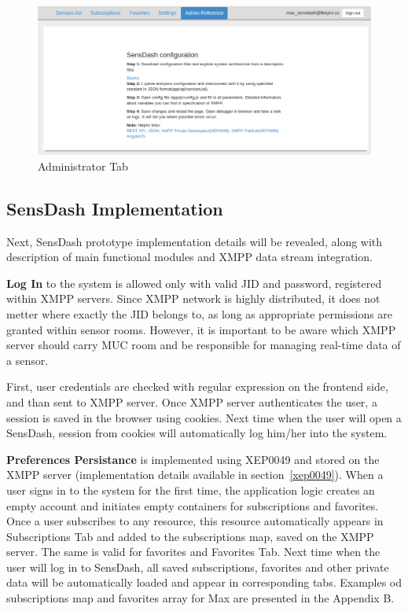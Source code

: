 \begin{figure}[!ht]
\centering
\includegraphics[scale=0.5]{Screenshots/UseCaseReferences.png}   
\caption[Administrator Tab]{Administrator Tab}
\label{img:admin}                         
\end{figure}

\subsection{SensDash Implementation}
Next, SensDash prototype implementation details will be revealed, along with description of main functional modules and XMPP data stream integration.

\textbf{Log In} to the system is allowed only with valid JID and password, registered within XMPP servers. Since XMPP network is highly distributed, it does not metter where exactly the JID belongs to, as long as appropriate permissions are granted within sensor rooms. However, it is important to be aware which XMPP server should carry MUC  room and be responsible for managing real-time data of a sensor.

First, user credentials are checked with regular expression on the frontend side, and than sent to XMPP server. Once XMPP server authenticates the user, a session is saved in the browser using cookies. Next time when the user will open a SensDash, session from cookies will automatically log him/her into the system. 

\textbf{Preferences Persistance} is implemented using XEP0049 and stored on the XMPP server (implementation details available in section~\ref{xep0049}). When a user signs in to the system for the first time, the application logic creates an empty account and initiates empty containers for subscriptions and favorites. Once a user subscribes to any resource, this resource automatically appears in Subscriptions Tab and added to the subscriptions map, saved on the XMPP server. The same is valid for favorites and Favorites Tab. Next time when the user will log in to SensDash, all saved subscriptions, favorites and other private data will be automatically loaded and appear in corresponding tabs. Examples od subscriptions map and favorites array for Max are presented in the Appendix B.

